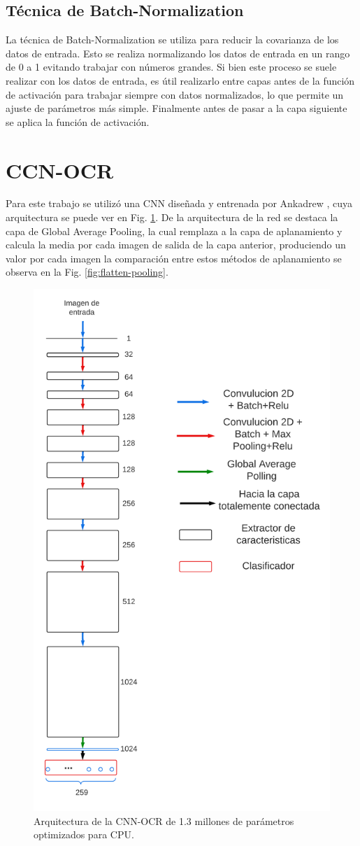 \subsection{Técnica de Batch-Normalization}

La técnica de Batch-Normalization se utiliza para reducir la covarianza de los datos de entrada. Esto se realiza normalizando los datos de entrada en un rango de 0 a 1 evitando trabajar con números grandes. Si bien este proceso se suele realizar con los datos de entrada, es útil realizarlo entre capas antes de la función de activación para trabajar siempre con datos normalizados, lo que permite un ajuste de parámetros más simple. Finalmente antes de pasar a la capa siguiente se aplica la función de activación.

\section{CCN-OCR}

Para este trabajo se utilizó una CNN diseñada y entrenada por Ankadrew \cite{ankandrew_reconocedor_2023}, cuya arquitectura se puede ver en Fig. \ref{fig:arquitectura-cnn-ocr}. De la arquitectura de la red se destaca la capa de Global Average Pooling, la cual remplaza a la capa de aplanamiento y calcula la media por cada imagen de salida de la capa anterior, produciendo un valor por cada imagen la comparación entre estos métodos de aplanamiento se observa en la Fig. \ref{fig:flatten-pooling}.
\begin{figure}[bth]
    \centering
    \includegraphics[width=.4\textwidth]{imgs/cnn-ocr.png}
    \caption{Arquitectura de la CNN-OCR de 1.3 millones de parámetros optimizados para CPU.}
    \label{fig:arquitectura-cnn-ocr}
\end{figure}

